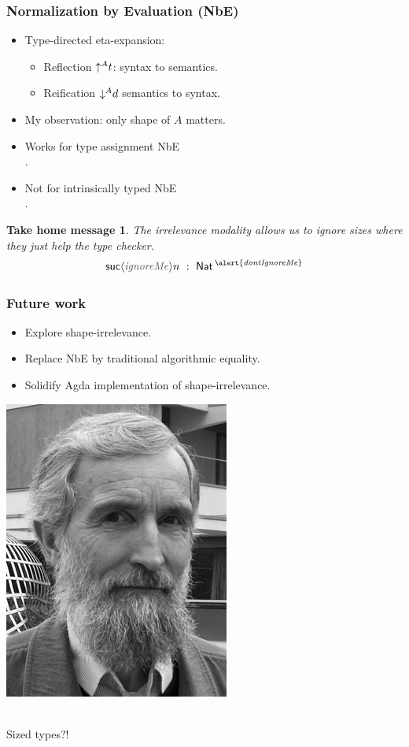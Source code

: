 \documentclass[t,fleqn]{beamer}
\newtheorem{takehomemessage}[theorem]{\textbf{Take home message}}
\newcommand{\cAnn}{\color{red!80!black}}%
\renewcommand{\emph}[1]{{\cAnn#1}}
\newcommand{\mlsays}[1]{
\begin{frame}%
  \begin{minipage}[c]{0.5\linewidth}
   \includegraphics[height=0.9\textheight]{martin-loef-bw.png}
  \end{minipage}%
  \begin{minipage}[c]{0.5\linewidth}
   \begin{center}
     \bla \\[8ex]
     \Huge #1
   \end{center}
  \end{minipage}
\end{frame}
}
\begin{document}
\begin{frame}%
  \frametitle{Normalization by Evaluation (NbE)}
  \begin{itemize}
  \item Type-directed eta-expansion:
    \begin{itemize}
    \item Reflection $\mathord{\uparrow^{A}} t$: syntax to semantics.
    \item Reification $\mathord{\downarrow^{A}} d$ semantics to syntax.
    \end{itemize}
  \item My observation: only \emph{shape} of $A$ matters.
  \item Works for \emph{type assignment} NbE \\ .
  \item Not for \emph{intrinsically typed} NbE \\ .
  \end{itemize}
\end{frame}

\begin{frame}%
\vfill
\hspace{0.15\textwidth}%
\begin{minipage}[c]{0.67\linewidth}
\begin{takehomemessage}
The irrelevance modality allows us to ignore sizes where they just help the type checker.
\[
  \suc {{\color{grey}\mathit{ignoreMe}}} n ~:~ \Nat^{\alert{\mathit{dontIgnoreMe}}}
\]
\vspace{-2ex}
\end{takehomemessage}
\end{minipage}
\vfill
\end{frame}

\begin{frame}%
  \frametitle{Future work}
  \begin{itemize}
  \item Explore \emph{shape-irrelevance}.
  \item Replace NbE by traditional algorithmic equality.
  \item Solidify Agda implementation of shape-irrelevance.
  \end{itemize}
\end{frame}


\mlsays{Sized types?!}



% 
\end{document}
